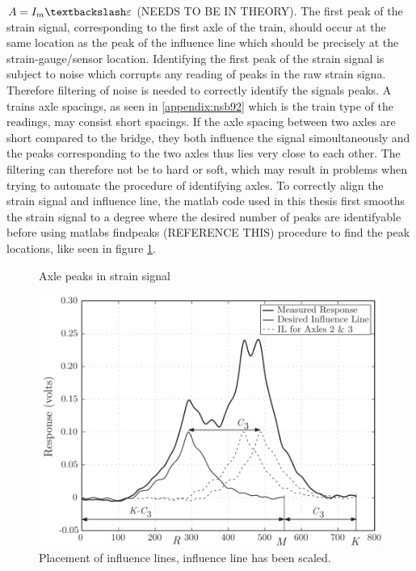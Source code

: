 $A = I_m \textbackslash \varepsilon$
(NEEDS TO BE IN THEORY).
The first peak of the strain signal, corresponding to the first axle of the train, should occur at the same location as the peak of the influence line which should be precisely at the strain-gauge/sensor location.
Identifying the first peak of the strain signal is subject to noise which corrupts any reading of peaks in the raw strain signa. Therefore filtering of noise is needed to correctly identify the signals peaks. A trains axle spacings, as seen in \ref{appendix:nsb92} which is the train type of the readings, may consist short spacings. If the axle spacing between two axles are short compared to the bridge, they both influence the signal simoultaneously and the peaks corresponding to the two axles thus lies very close to each other. The filtering can therefore not be to hard or soft, which may result in problems when trying to automate the procedure of identifying axles.
To correctly align the strain signal and influence line, the matlab code used in this thesis first smooths the strain signal to a degree where the desired number of peaks are identifyable before using matlabs findpeaks (REFERENCE THIS) procedure to find the peak locations, like seen in figure \ref{fig:axle_peaks}.
\begin{figure}[htbp]
	\centering
	
	\caption{Axle peaks in strain signal}
	\label{fig:axle_peaks}
\end{figure}
\begin{figure}[htbp]
	\centering
	\includegraphics[width=\textwidth]{figures/strain_vs_influenceline}
	\caption{Placement of influence lines, influence line has been scaled.}
	\label{fig:strain_vs_influenceLine}
\end{figure}


